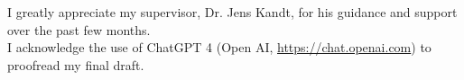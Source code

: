 \begin{acknowledgements}
I greatly appreciate my supervisor, Dr. Jens Kandt, for his guidance and support over the past few months.\\

I acknowledge the use of ChatGPT 4 (Open AI, \url{https://chat.openai.com}) to proofread my final draft.
\end{acknowledgements}

\setcounter{tocdepth}{2} 

\tableofcontents
\listoffigures
{}
\listoftables
{}





